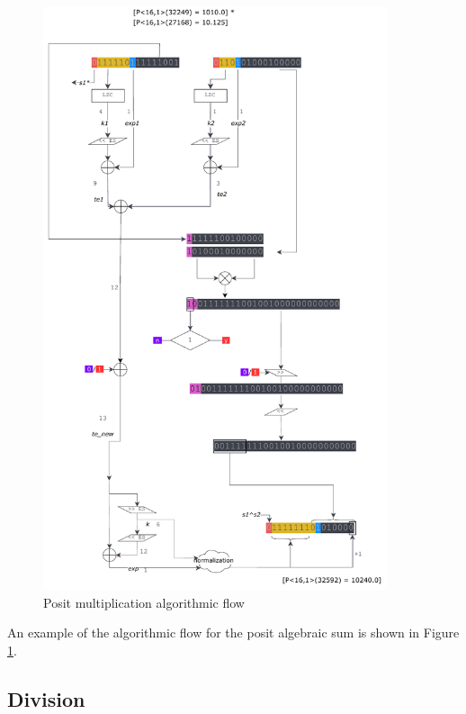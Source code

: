 \begin{figure}
    \begin{center}
    \includegraphics[width=0.90\textwidth]{figures/posit_mul_flow.pdf}
    \caption{Posit multiplication algorithmic flow}
    \label{fig:mulflow}
    \end{center}
\end{figure}
An example of the algorithmic flow for the posit algebraic sum is shown in Figure \ref{fig:mulflow}.

\subsection{Division}



